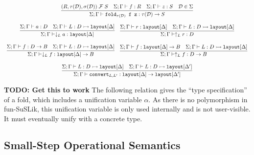 \documentclass[10pt]{article}
\begin{document}
\[\begin{array}{c}
    \infer{\Sigma ; \Gamma \vdash \ttt{fold}_{\tau(\mathcal{D})} \ttt{ f z} : \tau(\mathcal{D}) \ra S}{(R,\tau(\mathcal{D}),\sigma(\mathcal{D}))\; \mathcal{F}\; S & \Sigma ; \Gamma \vdash f : R & \Sigma ; \Gamma \vdash z : S & \mathcal{D} \in \Sigma}
    \\\\
    \infer{\Sigma ; \Gamma \vdash \downarrow_L a : \ttt{layout}[\Delta]}{\Sigma ; \Gamma \vdash a : D & \Sigma ; \Gamma \vdash L : D \hra \ttt{layout}[\Delta]}
    ~~~
    \infer{\Sigma ; \Gamma \vdash \uparrow_L r : D}{\Sigma ; \Gamma \vdash r : \ttt{layout}[\Delta] & \Sigma ; \Gamma \vdash L : D \hra \ttt{layout}[\Delta]}
    \\\\
    \infer{\Sigma ; \Gamma \vdash \downarrow_L f : \ttt{layout}[\Delta] \ra B}{\Sigma ; \Gamma \vdash f : D \ra B & \Sigma ; \Gamma \vdash L : D \hra \ttt{layout}[\Delta]}
    ~~~
    \infer{\Sigma ; \Gamma \vdash \uparrow_L f : D \ra B}{\Sigma ; \Gamma \vdash f : \ttt{layout}[\Delta] \ra B & \Sigma ; \Gamma \vdash L : D \hra \ttt{layout}[\Delta]}
    \\\\
    \infer{\Sigma ; \Gamma \vdash \ttt{convert}_{L,L'} : \ttt{layout}[\Delta] \ra \ttt{layout}[\Delta']}
          {\Sigma ; \Gamma \vdash L : D \hra \ttt{layout}[\Delta] & \Sigma ; \Gamma \vdash L : D \hra \ttt{layout}[\Delta']}
  \end{array}
\]

\textbf{TODO: Get this to work}
\noindent
The following relation gives the ``type specification'' of a fold, which includes a unification variable $\alpha$. As there is no
polymorphism in fun-SuSLik, this unification variable is only used internally and is not user-visible. It must eventually
unify with a concrete type.



%

\subsection{Small-Step Operational Semantics}
\end{document}
